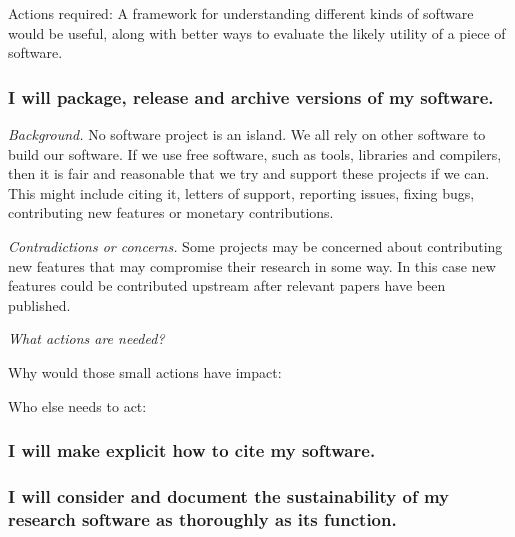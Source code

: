 \documentclass[a4paper,UKenglish]{dagman}
\renewcommand{\paragraph}[1]{\subsubsection*{#1}\xspace}
\begin{document}
Actions required: A framework for understanding different kinds of software would be useful, along with better ways to evaluate the likely utility of a piece of software. 


\paragraph{I will package, release and archive versions of my software.}




\emph{Background.}
No software project is an island. We all rely on other software to build our software. If we use free software, such as tools, libraries and compilers, then it is fair and reasonable that we try and support these projects if we can. This might include citing it, letters of support, reporting issues, fixing bugs, contributing new features or monetary contributions.

\emph{Contradictions or concerns.}
Some projects may be concerned about contributing new features that may compromise their research in some way. In this case new features could be contributed upstream after relevant papers have been published.

\emph{What actions are needed?}



Why would those small actions have impact:



Who else needs to act:




\paragraph{I will make explicit how to cite my software.}


\paragraph{I will consider and document the sustainability of my research software as thoroughly as its function.}


\end{document}

